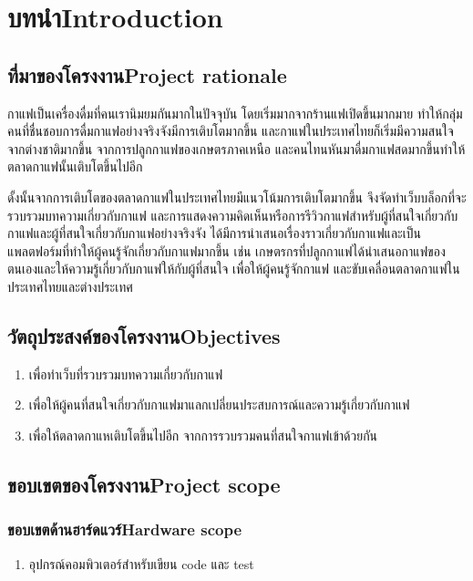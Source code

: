 \chapter{\ifcpe บทนำ\else Introduction\fi}

\section{\ifcpe ที่มาของโครงงาน\else Project rationale\fi}

กาแฟเป็นเครื่องดื่มที่คนเรานิมยมกันมากในปัจจุบัน โดยเริ่มมากจากร้านแฟเปิดขึ้นมากมาย ทำให้กลุ่มคนที่ชื่นชอบการดื่มกาแฟอย่างจริงจังมีการเติบโตมากขึ้น และกาแฟในประเทศไทยก็เริ่มมีความสนใจจากต่างชาติมากขึ้น จากการปลูกกาแฟของเกษตรภาคเหนือ และคนไทนหันมาดื่มกาแฟสดมากขึ้นทำให้ตลาดกาแฟนั้นเติบโตขึ้นไปอีก

ดั้งนั้นจากการเติบโตของตลาดกาแฟในประเทศไทยมีแนวโน้มการเติบโตมากขึ้น จึงจัดทำเว็บบล็อกที่จะรวบรวมบทความเกี่ยวกับกาแฟ และการแสดงความคิดเห็นหรือการรีวิวกาแฟสำหรับผู้ที่สนใจเกี่ยวกับกาแฟและผู้ที่สนใจเกี่ยวกับกาแฟอย่างจริงจัง ได้มีการนำเสนอเรื่องราวเกี่ยวกับกาแฟและเป็นแพลตฟอร์มที่ทำให้ผู้คนรู้จักเกี่ยวกับกาแฟมากขึ้น เช่น เกษตรกรที่ปลูกกาแฟได้นำเสนอกาแฟของตนเองและให้ความรู้เกี่ยวกับกาแฟให้กับผู้ที่สนใจ เพื่อให้ผู้คนรู้จักกาแฟ และขับเคลื่อนตลาดกาแฟในประเทศไทยและต่างประเทศ
\section{\ifcpe วัตถุประสงค์ของโครงงาน\else Objectives\fi}
\begin{enumerate}
    \item เพื่อทำเว็บที่รวบรวมบทความเกี่ยวกับกาแฟ
    \item เพื่อให้ผู้คนที่สนใจเกี่ยวกับกาแฟมาแลกเปลี่ยนประสบการณ์และความรู้เกี่ยวกับกาแฟ
    \item เพื่อให้ตลาดกาแหเติบโตขึ้นไปอีก จากการรวบรวมคนที่สนใจกาแฟเข้าด้วยกัน
\end{enumerate}

\section{\ifcpe ขอบเขตของโครงงาน\else Project scope\fi}

\subsection{\ifcpe ขอบเขตด้านฮาร์ดแวร์\else Hardware scope\fi}
\begin{enumerate}
    \item อุปกรณ์คอมพิวเตอร์สำหรับเขียน code และ test 
\end{enumerate}
